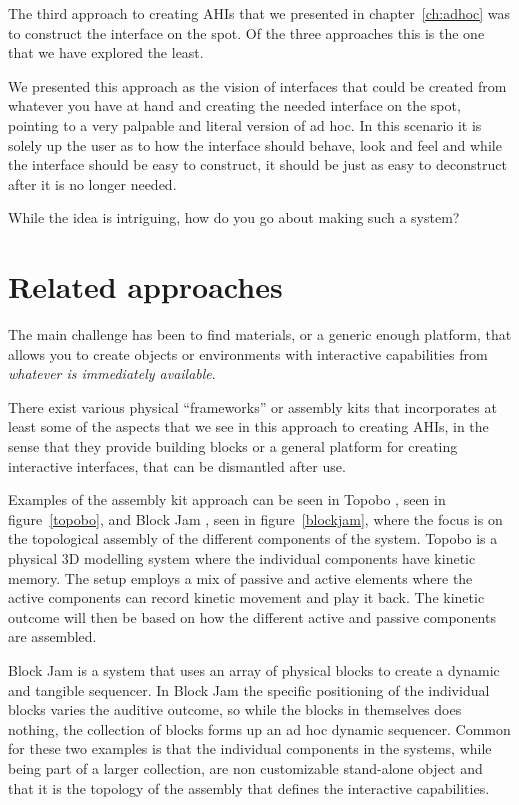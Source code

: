 \label{ch:prototype3}
The third approach to creating AHIs that we presented in chapter~\ref{ch:adhoc} was to construct the interface on the spot.
Of the three approaches this is the one that we have explored the least.

We presented this approach as the vision of interfaces that could be created from whatever you have at hand and creating the needed interface on the spot, pointing to a very palpable and literal version of ad hoc.
In this scenario it is solely up the user as to how the interface should behave, look and feel and while the interface should be easy to construct, it should be just as easy to deconstruct after it is no longer needed.

While the idea is intriguing, how do you go about making such a system?

\section{Related approaches}
The main challenge has been to find materials, or a generic enough platform, that allows you to create objects or environments with interactive capabilities from \emph{whatever is immediately available}. 

There exist various physical ``frameworks'' or assembly kits that incorporates at least some of the aspects that we see in this approach to creating AHIs, in the sense that they provide building blocks or a general platform for creating interactive interfaces, that can be dismantled after use.

Examples of the assembly kit approach can be seen in Topobo \citep{raffle2004topobo}, seen in figure~\ref{topobo}, and Block Jam \citep{newton2003block}, seen in figure~\ref{blockjam}, where the focus is on the topological assembly of the different components of the system. 
Topobo is a physical 3D modelling system where the individual components have kinetic memory. 
The setup employs a mix of passive and active elements where the active components can record kinetic movement and play it back.
The kinetic outcome will then be based on how the different active and passive components are assembled.

Block Jam is a system that uses an array of physical blocks to create a dynamic and tangible sequencer.
In Block Jam the specific positioning of the individual blocks varies the auditive outcome, so while the blocks in themselves does nothing, the collection of blocks forms up an ad hoc dynamic sequencer.
Common for these two examples is that the individual components in the systems, while being part of a larger collection, are non customizable stand-alone object and that it is the topology of the assembly that defines the interactive capabilities.

